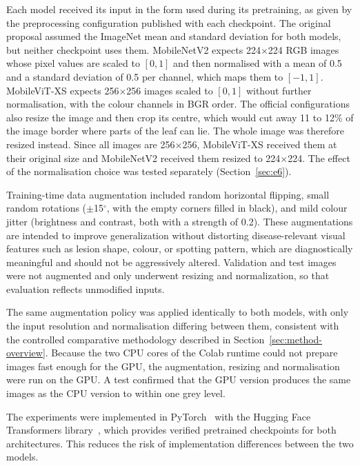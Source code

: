 \documentclass[conference]{IEEEtran}
\begin{document}
Each model received its input in the form used during its pretraining, as given by the preprocessing configuration published with each checkpoint. The original proposal assumed the ImageNet mean and standard deviation for both models, but neither checkpoint uses them. MobileNetV2 expects 224$\times$224 RGB images whose pixel values are scaled to $[0,1]$ and then normalised with a mean of 0.5 and a standard deviation of 0.5 per channel, which maps them to $[-1,1]$. MobileViT-XS expects 256$\times$256 images scaled to $[0,1]$ without further normalisation, with the colour channels in BGR order. The official configurations also resize the image and then crop its centre, which would cut away 11 to 12\% of the image border where parts of the leaf can lie. The whole image was therefore resized instead. Since all images are 256$\times$256, MobileViT-XS received them at their original size and MobileNetV2 received them resized to 224$\times$224. The effect of the normalisation choice was tested separately (Section~\ref{sec:e6}).

Training-time data augmentation included random horizontal flipping, small random rotations ($\pm$15$^{\circ}$, with the empty corners filled in black), and mild colour jitter (brightness and contrast, both with a strength of 0.2). These augmentations are intended to improve generalization without distorting disease-relevant visual features such as lesion shape, colour, or spotting pattern, which are diagnostically meaningful and should not be aggressively altered. Validation and test images were not augmented and only underwent resizing and normalization, so that evaluation reflects unmodified inputs.

The same augmentation policy was applied identically to both models, with only the input resolution and normalisation differing between them, consistent with the controlled comparative methodology described in Section~\ref{sec:method-overview}. Because the two CPU cores of the Colab runtime could not prepare images fast enough for the GPU, the augmentation, resizing and normalisation were run on the GPU. A test confirmed that the GPU version produces the same images as the CPU version to within one grey level.

The experiments were implemented in PyTorch~\cite{paszke2019pytorch} with the Hugging Face Transformers library~\cite{wolf2020transformers}, which provides verified pretrained checkpoints for both architectures. This reduces the risk of implementation differences between the two models.
\end{document}
